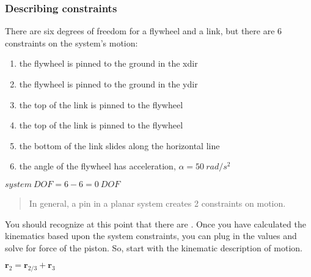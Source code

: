 \documentclass[letterpaper,10pt,english]{sphinxmanual}
\begin{document}
\subsubsection{Describing constraints}
\label{\detokenize{module_01/driving-forces:describing-constraints}}
There are six degrees of freedom for a flywheel and a link, but there
are 6 constraints on the system’s motion:
\begin{enumerate}
%
\item {} 
the flywheel is pinned to the ground in the x\sphinxhyphen{}dir

\item {} 
the flywheel is pinned to the ground in the y\sphinxhyphen{}dir

\item {} 
the top of the link is pinned to the flywheel

\item {} 
the top of the link is pinned to the flywheel

\item {} 
the bottom of the link slides along the horizontal line

\item {} 
the angle of the flywheel has acceleration, \(\alpha=50~rad/s^2\)

\end{enumerate}

\(system~DOF = 6 - 6 = 0~DOF\)
\begin{quote}

 In general, a pin in a planar system creates 2 constraints on motion.
\end{quote}

You should recognize at this point that there are . Once you have calculated the kinematics based upon
the system constraints, you can plug in the values and solve for force
of the piston. So, start with the kinematic description of motion.

\(\mathbf{r}_2 =\mathbf{r}_{2/3} + \mathbf{r}_3\)

\begin{sphinxVerbatim}[commandchars=\\\{\}]
  
\end{sphinxVerbatim}
\end{document}
